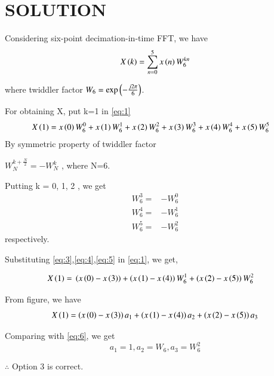 \documentclass[journal,12pt,twocolumn]{IEEEtran}
\begin{document}
\section*{SOLUTION}

Considering six-point decimation-in-time FFT, we have 
\\
\begin{align}
\label{eq:1}
X\left(k\right) = \sum_{n=0}^5 x\left(n\right) W_{6}^{kn}
\end{align}

where twiddler factor $W_{6} = \text{exp}\left(-\frac{j2\pi}{6}\right)$.

For obtaining X, put k=1 in \eqref{eq:1}
\\
{\small
\begin{align}
X\left(1\right)={}& x\left(0\right)W_{6}^{0}+x\left(1\right)W_{6}^{1}+x\left(2\right)W_{6}^{2}+x\left(3\right)W_{6}^{3}+x\left(4\right)W_{6}^{4}+x\left(5\right)W_{6}^{5}
\label{eq:2}
\end{align}
}
By symmetric property of twiddler factor 
\begin{center}
$W_{N}^{k+\frac{N}{2}} = -W_{N}^{k}$ , where N=6.
\end{center}
Putting k = 0, 1, 2 , we get \\
\begin{align}
\label{eq:3}
W_{6}^{3}={}&-W_{6}^{0}\\
\label{eq:4}
W_{6}^{4}={}&-W_{6}^{1}\\
\label{eq:5}
W_{6}^{5}={}&-W_{6}^{2}
\end{align}
respectively.

Substituting \eqref{eq:3},\eqref{eq:4},\eqref{eq:5} in \eqref{eq:1}, we get,

\begin{align}
X\left(1\right)={}&\left(x\left(0\right)-x\left(3\right)\right) + \left(x\left(1\right)-x\left(4\right)\right)W_{6}^{1} + \left(x\left(2\right)-x\left(5\right)\right)W_{6}^{2}
\label{eq:6}
\end{align}

From figure, we have 
$$X\left(1\right)=\left(x\left(0\right)-x\left(3\right)\right)a_{1} + \left(x\left(1\right)-x\left(4\right)\right)a_{2} + \left(x\left(2\right)-x\left(5\right)\right)a_{3}$$

Comparing with \eqref{eq:6}, we get 
$$a_{1}=1, a_{2}=W_{6}, a_{3}=W_{6}^{2}$$

$\therefore$ Option 3 is correct.
\end{document}

